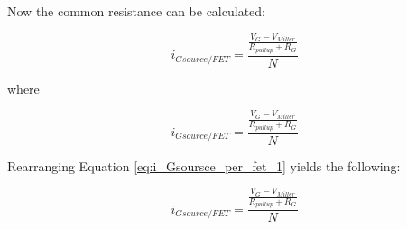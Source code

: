     Now the common resistance can be calculated:
    
    \begin{equation}
        i_{Gsource/FET} = \frac{\frac{V_G - V_{Miller}}{R_{pullup} + R_G}}{N}
        \label{eq:i_Gsoursce_per_fet_1}
    \end{equation}
    
    where
    
        \begin{equation}
        i_{Gsource/FET} = \frac{\frac{V_G - V_{Miller}}{R_{pullup} + R_G}}{N}
        \label{eq:i_Gsoursce_per_fet_1}
    \end{equation}
    
    Rearranging Equation \ref{eq:i_Gsoursce_per_fet_1} yields the following:
    
    \begin{equation}
        i_{Gsource/FET} = \frac{\frac{V_G - V_{Miller}}{R_{pullup} + R_G}}{N}
        \label{eq:i_Gsoursce_per_fet_1}
    \end{equation}
